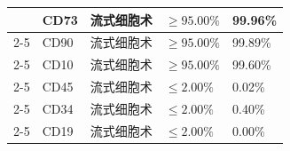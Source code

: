\documentclass[UTF8,10pt,a4paper,fontset=fandol]{ctexart}
\newcommand{\fieldvalue}[1]{#1}
\begin{document}
\begin{center}
\begin{tabular}{|p{1.45cm}|p{2.05cm}|p{3.45cm}|p{4.35cm}|p{4.25cm}|}
&
\fieldvalue{CD73}
&
\fieldvalue{流式细胞术}
&
\fieldvalue{$\geq 95.00\%$}
&
\fieldvalue{99.96\%}
\\ \cline{2-5}

&
\fieldvalue{CD90}
&
\fieldvalue{流式细胞术}
&
\fieldvalue{$\geq 95.00\%$}
&
\fieldvalue{99.89\%}
\\ \cline{2-5}

&
\fieldvalue{CD10}
&
\fieldvalue{流式细胞术}
&
\fieldvalue{$\geq 95.00\%$}
&
\fieldvalue{99.60\%}
\\ \cline{2-5}

&
\fieldvalue{CD45}
&
\fieldvalue{流式细胞术}
&
\fieldvalue{$\leq 2.00\%$}
&
\fieldvalue{0.02\%}
\\ \cline{2-5}

&
\fieldvalue{CD34}
&
\fieldvalue{流式细胞术}
&
\fieldvalue{$\leq 2.00\%$}
&
\fieldvalue{0.40\%}
\\ \cline{2-5}

&
\fieldvalue{CD19}
&
\fieldvalue{流式细胞术}
&
\fieldvalue{$\leq 2.00\%$}
&
\fieldvalue{0.00\%}
\\ \hline
\end{tabular}
\end{center}
\end{document}
